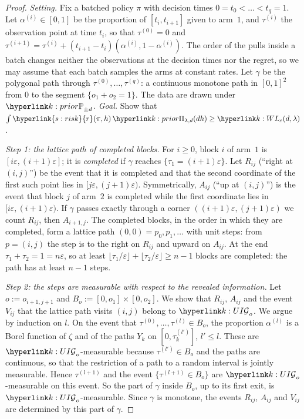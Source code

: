 \documentclass[11pt]{article}
\DeclareRobustCommand{\sy}[2]{{\hyperlink{#1}{#2}}}
\newcommand{\1}{\mathbf{1}}
\newcommand{\rk}{\sy{s:risk}{r}}
\begin{document}
\begin{proof}
\textit{Setting.} Fix a batched policy $\pi$ with decision times $0=t_0<\dots<t_q=1$. Let $\alpha^{(i)}\in[0,1]$ be the proportion of $[t_i,t_{i+1}]$ given to arm~$1$,
and $\tau^{(i)}$ the observation point at time $t_i$, so that $\tau^{(0)}=0$ and $\tau^{(i+1)}=\tau^{(i)}+(t_{i+1}-t_i)(\alpha^{(i)},1-\alpha^{(i)})$. The order of the pulls inside a batch
changes neither the observations at the decision times nor the regret, so we may assume that each batch samples the arms at constant rates. Let $\gamma$ be the
polygonal path through $\tau^{(0)},\dots,\tau^{(q)}$: a continuous monotone path in $[0,1]^2$ from $0$ to the segment $\{o_1+o_2=1\}$. The data are drawn under
$\kP{\pm d}$. \textit{Goal.} Show that $\int\rk(\pi,h)\,\kPri(dh)\ge\kL(d,\lambda)$.

\textit{Step 1: the lattice path of completed blocks.} For $i\ge0$, block $i$ of arm~$1$ is $[i\varepsilon,(i+1)\varepsilon]$; it is \emph{completed} if $\gamma$ reaches
$\{\tau_1=(i+1)\varepsilon\}$. Let $R_{ij}$ (``right at $(i,j)$'') be the event that it is completed and that the second coordinate of the first such point lies in
$[j\varepsilon,(j+1)\varepsilon)$. Symmetrically, $A_{ij}$ (``up at $(i,j)$'') is the event that block $j$ of arm~$2$ is completed while the first coordinate lies in
$[i\varepsilon,(i+1)\varepsilon)$. If $\gamma$ passes exactly through a corner $((i+1)\varepsilon,(j+1)\varepsilon)$ we count $R_{ij}$, then $A_{i+1,j}$. The completed blocks, in
the order in which they are completed, form a lattice path $(0,0)=p_0,p_1,\dots$ with unit steps: from $p=(i,j)$ the step is to the right on $R_{ij}$ and upward on
$A_{ij}$. At the end $\tau_1+\tau_2=1=n\varepsilon$, so at least $\lfloor\tau_1/\varepsilon\rfloor+\lfloor\tau_2/\varepsilon\rfloor\ge n-1$ blocks are completed: the path has at least
$n-1$ steps.

\textit{Step 2: the steps are measurable with respect to the revealed information.} Let $o:=o_{i+1,j+1}$ and $B_o:=[0,o_1]\times[0,o_2]$. We show that $R_{ij}$, $A_{ij}$
and the event $V_{ij}$ that the lattice path visits $(i,j)$ belong to $\kF_o$. We argue by induction on $l$. On the event that $\tau^{(0)},\dots,\tau^{(l)}\in B_o$, the
proportion $\alpha^{(l)}$ is a Borel function of $\zeta$ and of the paths $Y_k$ on $[0,\tau^{(l')}_k]$, $l'\le l$. These are $\kF_o$-measurable because
$\tau^{(l')}\in B_o$ and the paths are continuous, so that the restriction of a path to a random interval is jointly measurable. Hence $\tau^{(l+1)}$ and the event
$\{\tau^{(l+1)}\in B_o\}$ are $\kF_o$-measurable on this event. So the part of $\gamma$ inside $B_o$, up to its first exit, is $\kF_o$-measurable. Since $\gamma$ is
monotone, the events $R_{ij}$, $A_{ij}$ and $V_{ij}$ are determined by this part of $\gamma$.


\end{proof}
\end{document}
